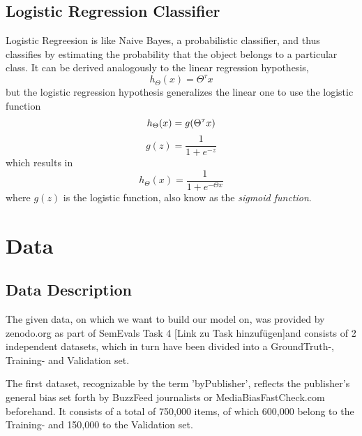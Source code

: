 \documentclass[a4paper, 11pt,titlepage,oneside,openany]{book}
\begin{document}
\section{Logistic Regression Classifier}
Logistic Regreesion is like Naive Bayes, a probabilistic classifier, and thus classifies by estimating the probability that the object belongs to a particular class. It can be derived analogously to the linear regression hypothesis, 
\[
h_\Theta(x)=\Theta^\tau x
\]
but the logistic regression hypothesis generalizes the linear one to use the logistic function
\[
h_\Theta(x)=g(\Theta^\tau x) \\
\]
\[
g(z)=\frac{1}{1+e^{-z}}
\]
which results in
\[
h_\Theta(x)=\frac{1}{1+e^{-\Theta x}}
\]
where $g(z)$ is the logistic function, also know as the \textit{sigmoid function}.
\chapter{Data}
\label{cha:theory}


\section{Data Description}
 The given data, on which we want to build our model on, was provided by zenodo.org as part of SemEvals Task 4 [Link zu Task hinzufügen]and consists of 2 independent datasets, which in turn have been divided into a GroundTruth-, Training- and Validation set.
 
 \noindent The first dataset, recognizable by the term 'byPublisher', reflects the publisher's general bias set forth by BuzzFeed journalists or MediaBiasFastCheck.com beforehand. It consists of a total of 750,000 items, of which 600,000 belong to the Training- and 150,000 to the Validation set.
 
\end{document}
